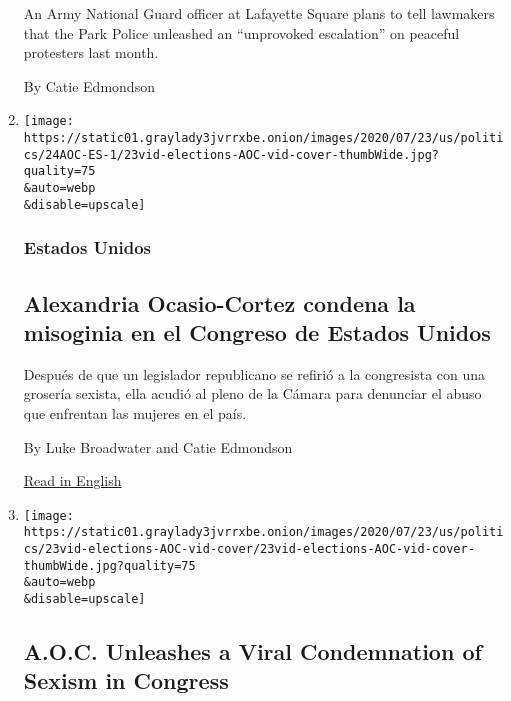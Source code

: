 \begin{enumerate}
  An Army National Guard officer at Lafayette Square plans to tell
  lawmakers that the Park Police unleashed an ``unprovoked escalation''
  on peaceful protesters last month.

  By Catie Edmondson
\item
  \href{/es/2020/07/24/espanol/estados-unidos/alexandria-ocasio-cortez-insulto.html}{}

  \texttt{[image: https://static01.graylady3jvrrxbe.onion/images/2020/07/23/us/politics/24AOC-ES-1/23vid-elections-AOC-vid-cover-thumbWide.jpg?quality=75\\\&auto=webp\\\&disable=upscale]}

  \hypertarget{estados-unidos}{%
  \subsubsection{Estados Unidos}\label{estados-unidos}}

  \hypertarget{alexandria-ocasio-cortez-condena-la-misoginia-en-el-congreso-de-estados-unidos}{%
  \subsection{Alexandria Ocasio-Cortez condena la misoginia en el
  Congreso de Estados
  Unidos}\label{alexandria-ocasio-cortez-condena-la-misoginia-en-el-congreso-de-estados-unidos}}

  Después de que un legislador republicano se refirió a la congresista
  con una grosería sexista, ella acudió al pleno de la Cámara para
  denunciar el abuso que enfrentan las mujeres en el país.

  By Luke Broadwater and Catie Edmondson

  \href{https://www.nytimes3xbfgragh.onion/2020/07/23/us/alexandria-ocasio-cortez-sexism-congress.html}{Read
  in English}
\item
  \href{/2020/07/23/us/alexandria-ocasio-cortez-sexism-congress.html}{}

  \texttt{[image: https://static01.graylady3jvrrxbe.onion/images/2020/07/23/us/politics/23vid-elections-AOC-vid-cover/23vid-elections-AOC-vid-cover-thumbWide.jpg?quality=75\\\&auto=webp\\\&disable=upscale]}

  \hypertarget{aoc-unleashes-a-viral-condemnation-of-sexism-in-congress}{%
  \subsection{A.O.C. Unleashes a Viral Condemnation of Sexism in
  Congress}\label{aoc-unleashes-a-viral-condemnation-of-sexism-in-congress}}


\end{enumerate}
